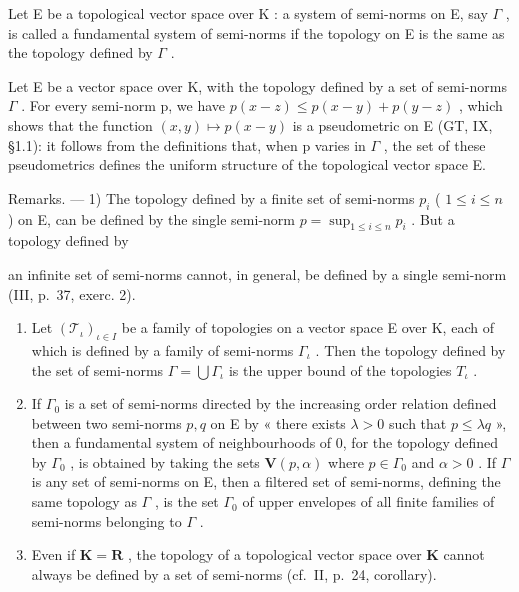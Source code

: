 Let E be a topological vector space over K : a system of semi-norms on E, say \(\Gamma\) , is called a fundamental system of semi-norms if the topology on E is the same as the topology defined by \(\Gamma\) .

Let E be a vector space over K, with the topology defined by a set of semi-norms \(\Gamma\) . For every semi-norm p, we have \(p(x - z) \leqslant p(x - y) + p(y - z)\) , which shows that the function \((x, y) \mapsto p(x - y)\) is a pseudometric on E (GT, IX, §1.1): it follows from the definitions that, when p varies in \(\Gamma\) , the set of these pseudometrics defines the uniform structure of the topological vector space E.

Remarks. --- 1) The topology defined by a finite set of semi-norms \(p_i\) ( \(1 \leqslant i \leqslant n\) ) on E, can be defined by the single semi-norm \(p = \sup_{1 \leqslant i \leqslant n} p_i\) . But a topology defined by

an infinite set of semi-norms cannot, in general, be defined by a single semi-norm (III, p.~37, exerc. 2).

\begin{enumerate}
\def\labelenumi{\arabic{enumi})}
\setcounter{enumi}{1}
\item
  Let \((\mathcal{T}_{\iota})_{\iota\in I}\) be a family of topologies on a vector space E over K, each of which is defined by a family of semi-norms \(\Gamma_{\iota}\) . Then the topology defined by the set of semi-norms \(\Gamma = \bigcup \Gamma_{\iota}\) is the upper bound of the topologies \(T_{\iota}\) .
\item
  If \(\Gamma_0\) is a set of semi-norms directed by the increasing order relation defined between two semi-norms \(p, q\) on E by « there exists \(\lambda > 0\) such that \(p \leqslant \lambda q\) », then a fundamental system of neighbourhoods of 0, for the topology defined by \(\Gamma_0\) , is obtained by taking the sets \(\mathbf{V}(p, \alpha)\) where \(p \in \Gamma_0\) and \(\alpha > 0\) . If \(\Gamma\) is any set of semi-norms on E, then a filtered set of semi-norms, defining the same topology as \(\Gamma\) , is the set \(\Gamma_0\) of upper envelopes of all finite families of semi-norms belonging to \(\Gamma\) .
\item
  Even if \(\mathbf{K} = \mathbf{R}\) , the topology of a topological vector space over \(\mathbf{K}\) cannot always be defined by a set of semi-norms (cf.~II, p.~24, corollary).
\end{enumerate}

